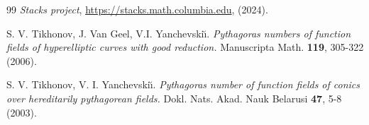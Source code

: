 \documentclass[a4paper,12pt,reqno]{amsart}
\theoremstyle{definition}
\numberwithin{equation}{thm}
\begin{document}
\begin{thebibliography}{99}
 \textit{Stacks project}, \url{https://stacks.math.columbia.edu}, (2024).

S. V. Tikhonov, J. Van Geel, V.I. Yanchevski\u{\i}. \textit{Pythagoras numbers of function fields of hyperelliptic curves with good reduction.} Manuscripta Math. \textbf{119}, 305-322 (2006).


S. V. Tikhonov, V. I. Yanchevski\u{\i}. \textit{Pythagoras number of function fields of conics over hereditarily pythagorean fields.} Dokl. Nats. Akad. Nauk Belarusi \textbf{47}, 5-8 (2003).








%



\end{thebibliography}
\end{document}
